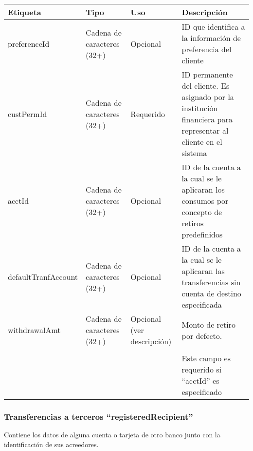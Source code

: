 \begin{center}
\begin{longtable}{|>{\centering\arraybackslash}p{}|>{\centering\arraybackslash}p{}|>{\centering\arraybackslash}p{}|>{\centering\arraybackslash}p{}|}
\hline 
\bfseries {Etiqueta} & \bfseries {Tipo} & \bfseries {Uso} & \bfseries {Descripción} \\ 
\hline 
preferenceId & Cadena de caracteres (32+) & Opcional & ID que identifica a la información de preferencia del cliente \\ 
\hline 
custPermId & Cadena de caracteres (32+) & Requerido & ID permanente del cliente. Es asignado por la institución financiera para representar al cliente en el sistema \\
\hline 
acctId & Cadena de caracteres (32+) & Opcional & ID de la cuenta a la cual se le aplicaran los consumos por concepto de retiros predefinidos \\ 
\hline 
defaultTranfAccount & Cadena de caracteres (32+) & Opcional & ID de la cuenta a la cual se le aplicaran las transferencias sin cuenta de destino especificada \\ 
\hline
withdrawalAmt & Cadena de caracteres (32+) & Opcional (ver descripción) & Monto de retiro por defecto. 
\\ & & & \\
& & & Este campo es requerido si ``acctId'' es especificado \\
\hline
\end{longtable}
\end{center}

\subsubsection{Transferencias a terceros ``registeredRecipient''}
Contiene los datos de alguna cuenta o tarjeta de otro banco junto con la identificación de sus acreedores.

